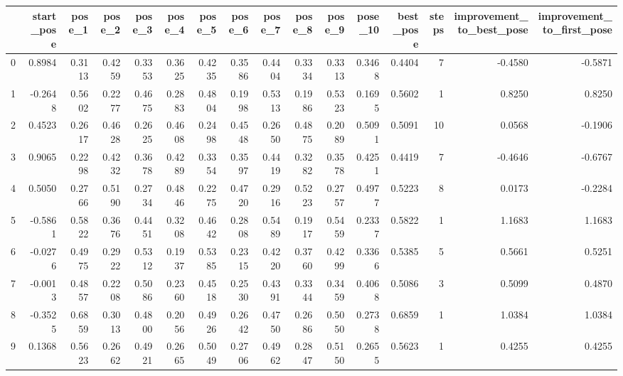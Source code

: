\begin{tabular}{lrrrrrrrrrrrrrrr}
\toprule
{} &  start\_pose &  pose\_1 &  pose\_2 &  pose\_3 &  pose\_4 &  pose\_5 &  pose\_6 &  pose\_7 &  pose\_8 &  pose\_9 &  pose\_10 &  best\_pose &  steps &  improvement\_to\_best\_pose &  improvement\_to\_first\_pose \\
\midrule
0  &      0.8984 &  0.3113 &  0.4259 &  0.3353 &  0.3625 &  0.4235 &  0.3586 &  0.4404 &  0.3334 &  0.3313 &   0.3468 &     0.4404 &      7 &                   -0.4580 &                    -0.5871 \\
1  &     -0.2648 &  0.5602 &  0.2277 &  0.4675 &  0.2883 &  0.4804 &  0.1998 &  0.5313 &  0.1986 &  0.5323 &   0.1695 &     0.5602 &      1 &                    0.8250 &                     0.8250 \\
2  &      0.4523 &  0.2617 &  0.4628 &  0.2625 &  0.4608 &  0.2498 &  0.4548 &  0.2650 &  0.4875 &  0.2089 &   0.5091 &     0.5091 &     10 &                    0.0568 &                    -0.1906 \\
3  &      0.9065 &  0.2298 &  0.4232 &  0.3678 &  0.4289 &  0.3354 &  0.3597 &  0.4419 &  0.3282 &  0.3578 &   0.4251 &     0.4419 &      7 &                   -0.4646 &                    -0.6767 \\
4  &      0.5050 &  0.2766 &  0.5190 &  0.2734 &  0.4846 &  0.2275 &  0.4720 &  0.2916 &  0.5223 &  0.2757 &   0.4977 &     0.5223 &      8 &                    0.0173 &                    -0.2284 \\
5  &     -0.5861 &  0.5822 &  0.3676 &  0.4451 &  0.3208 &  0.4642 &  0.2808 &  0.5489 &  0.1917 &  0.5459 &   0.2337 &     0.5822 &      1 &                    1.1683 &                     1.1683 \\
6  &     -0.0276 &  0.4975 &  0.2922 &  0.5312 &  0.1937 &  0.5385 &  0.2315 &  0.4220 &  0.3760 &  0.4299 &   0.3366 &     0.5385 &      5 &                    0.5661 &                     0.5251 \\
7  &     -0.0013 &  0.4857 &  0.2208 &  0.5086 &  0.2360 &  0.4518 &  0.2530 &  0.4391 &  0.3344 &  0.3459 &   0.4068 &     0.5086 &      3 &                    0.5099 &                     0.4870 \\
8  &     -0.3525 &  0.6859 &  0.3013 &  0.4800 &  0.2056 &  0.4926 &  0.2642 &  0.4750 &  0.2686 &  0.5050 &   0.2738 &     0.6859 &      1 &                    1.0384 &                     1.0384 \\
9  &      0.1368 &  0.5623 &  0.2662 &  0.4921 &  0.2665 &  0.5049 &  0.2706 &  0.4962 &  0.2847 &  0.5150 &   0.2655 &     0.5623 &      1 &                    0.4255 &                     0.4255 \\

\end{tabular}
